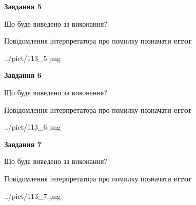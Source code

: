 \documentclass[10pt, ukrainian]{article}
\begin{document}
{\begin {large}
{\begin {center}\textbf{Завдання 5}\end {center}}\par
Що буде виведено за виконання? \par
Повідомлення інтерпретатора про помилку позначати \textbf{error}

\begin{center}
	{../pict/113_5.png}
\end{center}
\newpage

{\begin {center}\textbf{Завдання 6}\end {center}}\par
Що буде виведено за виконання? \par
Повідомлення інтерпретатора про помилку позначати \textbf{error}

\begin{center}
	{../pict/113_6.png}
\end{center}
\newpage

{\begin {center}\textbf{Завдання 7}\end {center}}\par
Що буде виведено за виконання? \par
Повідомлення інтерпретатора про помилку позначати \textbf{error}

\begin{center}
	{../pict/113_7.png}
\end{center}
\newpage

\end {large}}
\end{document}
